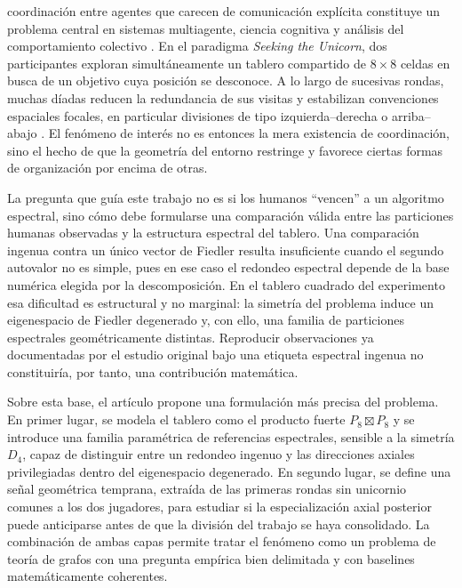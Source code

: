 \documentclass[journal]{IEEEtran}
\begin{document}
 coordinación entre agentes que carecen de comunicación explícita constituye un problema central en sistemas multiagente, ciencia cognitiva y análisis del comportamiento colectivo \cite{mesbahi2010,andrade2021,goldstone2024}. En el paradigma \emph{Seeking the Unicorn}, dos participantes exploran simultáneamente un tablero compartido de $8\times 8$ celdas en busca de un objetivo cuya posición se desconoce. A lo largo de sucesivas rondas, muchas díadas reducen la redundancia de sus visitas y estabilizan convenciones espaciales focales, en particular divisiones de tipo izquierda--derecha o arriba--abajo \cite{andrade2021}. El fenómeno de interés no es entonces la mera existencia de coordinación, sino el hecho de que la geometría del entorno restringe y favorece ciertas formas de organización por encima de otras.

La pregunta que guía este trabajo no es si los humanos ``vencen'' a un algoritmo espectral, sino cómo debe formularse una comparación válida entre las particiones humanas observadas y la estructura espectral del tablero. Una comparación ingenua contra un único vector de Fiedler resulta insuficiente cuando el segundo autovalor no es simple, pues en ese caso el redondeo espectral depende de la base numérica elegida por la descomposición. En el tablero cuadrado del experimento esa dificultad es estructural y no marginal: la simetría del problema induce un eigenespacio de Fiedler degenerado y, con ello, una familia de particiones espectrales geométricamente distintas. Reproducir observaciones ya documentadas por el estudio original \cite{andrade2021} bajo una etiqueta espectral ingenua no constituiría, por tanto, una contribución matemática.

Sobre esta base, el artículo propone una formulación más precisa del problema. En primer lugar, se modela el tablero como el producto fuerte $P_8 \boxtimes P_8$ y se introduce una familia paramétrica de referencias espectrales, sensible a la simetría $D_4$, capaz de distinguir entre un redondeo ingenuo y las direcciones axiales privilegiadas dentro del eigenespacio degenerado. En segundo lugar, se define una señal geométrica temprana, extraída de las primeras rondas sin unicornio comunes a los dos jugadores, para estudiar si la especialización axial posterior puede anticiparse antes de que la división del trabajo se haya consolidado. La combinación de ambas capas permite tratar el fenómeno como un problema de teoría de grafos con una pregunta empírica bien delimitada y con baselines matemáticamente coherentes.
\end{document}
